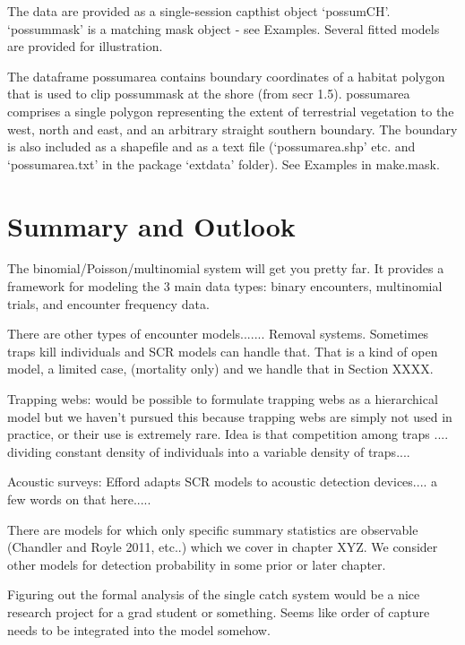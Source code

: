 The data are provided as a single-session capthist object
‘possumCH’. ‘possummask’ is a matching mask object - see
Examples. Several fitted models are provided for illustration.

The dataframe possumarea contains boundary coordinates of a habitat
polygon that is used to clip possummask at the shore (from secr
1.5). possumarea comprises a single polygon representing the extent of
terrestrial vegetation to the west, north and east, and an arbitrary
straight southern boundary. The boundary is also included as a
shapefile and as a text file (‘possumarea.shp’ etc. and
‘possumarea.txt’ in the package ‘extdata’ folder). See Examples in
make.mask.





\section{Summary and Outlook}

The binomial/Poisson/multinomial system will get you pretty far. It
provides a framework for modeling the 3 main data types: binary
encounters, multinomial trials, and encounter frequency data.

There are other types of encounter models.......
Removal systems. Sometimes traps kill individuals and SCR models can handle
that. That is a kind of open model, a limited case, (mortality only) and we handle that
in Section XXXX.

Trapping webs:
would be possible to formulate trapping webs as a hierarchical model
but we haven't pursued this because trapping webs are simply not used
in practice, or their use is extremely rare.  Idea is that competition
among traps .... dividing constant density of individuals into a
variable density of traps.... 

Acoustic surveys:
Efford adapts SCR models to acoustic detection devices.... a few words
on that here.....

There are models for which
only specific summary statistics are observable (Chandler and Royle
2011, etc..) which we cover in chapter XYZ.  We consider other models
for detection probability in some prior or later chapter. 


Figuring out the formal analysis of the single catch system would be
a nice research project for a grad student or something. 
Seems like order of capture needs to be integrated into the model somehow.

